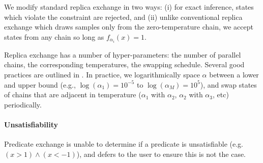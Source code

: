 We modify standard replica exchange in two ways: (i) for exact inference, states which violate the constraint are rejected, and (ii)
unlike conventional replica exchange which draws samples only from the zero-temperature chain, we accept states from any chain so long as $f_{\alpha_i}(x) = 1$.

Replica exchange has a number of hyper-parameters: the number of parallel chains, the corresponding temperatures, the swapping schedule.
Several good practices are outlined in \cite{earl2005parallel}.  In practice, we logarithmically space $\alpha$ between a lower and upper bound (e.g., $\log(\alpha_1) = 10^{-5}$ to $\log(\alpha_M) = 10^5$), and swap states of chains that are adjacent in temperature ($\alpha_1$ with $\alpha_2$, $\alpha_2$ with $\alpha_3$, etc) periodically.

\paragraph{Unsatisfiability}Predicate exchange is unable to determine if a predicate is unsatisfiable (e.g.  $(x > 1) \land (x < -1)$), and defers to the user to ensure this is not the case.






